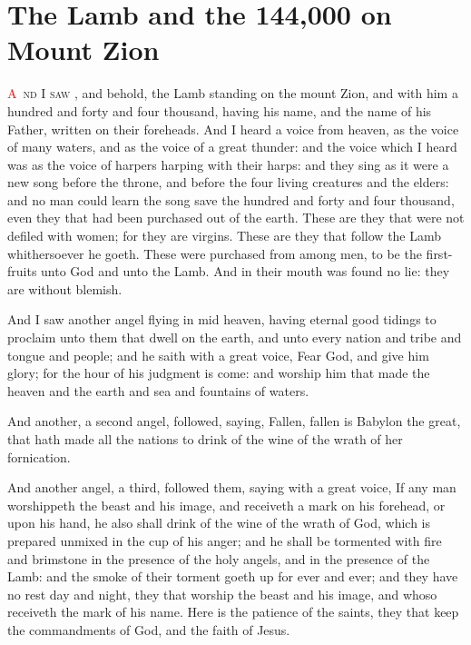 
\chapter{The Lamb and the 144,000 on Mount Zion}
\lettrine[lines=3,slope=0.5em]{\textcolor{red}{A}}{\ nd I saw}%
, and behold, the Lamb standing on the mount Zion, and with him a hundred and forty and four thousand, having his name, and the name of his Father, written on their foreheads. %
 And I heard a voice from heaven, as the voice of many waters, and as the voice of a great thunder: and the voice which I heard was as the voice of harpers harping with their harps: 
 and they sing as it were a new song before the throne, and before the four living creatures and the elders: and no man could learn the song save the hundred and forty and four thousand, even they that had been purchased out of the earth. 
 These are they that were not defiled with women; for they are virgins. These are they that follow the Lamb whithersoever he goeth. These were purchased from among men, to be the first-fruits unto God and unto the Lamb. 
 And in their mouth was found no lie: they are without blemish.

 And I saw another angel flying in mid heaven, having eternal good tidings to proclaim unto them that dwell on the earth, and unto every nation and tribe and tongue and people; 
 and he saith with a great voice, Fear God, and give him glory; for the hour of his judgment is come: and worship him that made the heaven and the earth and sea and fountains of waters.

 And another, a second angel, followed, saying, Fallen, fallen is Babylon the great, that hath made all the nations to drink of the wine of the wrath of her fornication.

 And another angel, a third, followed them, saying with a great voice, If any man worshippeth the beast and his image, and receiveth a mark on his forehead, or upon his hand, 
 he also shall drink of the wine of the wrath of God, which is prepared unmixed in the cup of his anger; and he shall be tormented with fire and brimstone in the presence of the holy angels, and in the presence of the Lamb: 
 and the smoke of their torment goeth up for ever and ever; and they have no rest day and night, they that worship the beast and his image, and whoso receiveth the mark of his name. 
 Here is the patience of the saints, they that keep the commandments of God, and the faith of Jesus.

